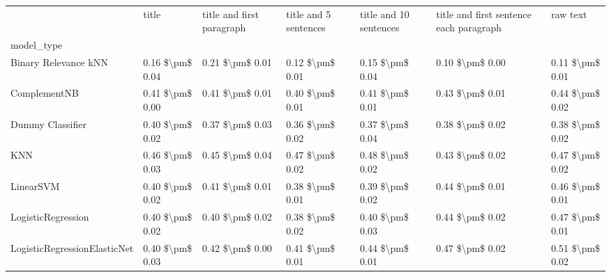 \begin{tabular}{lllllll}
\toprule
{} &            title & title and first paragraph & title and 5 sentences & title and 10 sentences & title and first sentence each paragraph &             raw text \\
model\_type                      &                  &                           &                       &                        &                                         &                      \\
\midrule
Binary Relevance kNN            &  0.16 \$\textbackslash pm\$ 0.04 &           0.21 \$\textbackslash pm\$ 0.01 &       0.12 \$\textbackslash pm\$ 0.01 &        0.15 \$\textbackslash pm\$ 0.04 &                         0.10 \$\textbackslash pm\$ 0.00 &      0.11 \$\textbackslash pm\$ 0.01 \\
ComplementNB                    &  0.41 \$\textbackslash pm\$ 0.00 &           0.41 \$\textbackslash pm\$ 0.01 &       0.40 \$\textbackslash pm\$ 0.01 &        0.41 \$\textbackslash pm\$ 0.01 &                         0.43 \$\textbackslash pm\$ 0.01 &      0.44 \$\textbackslash pm\$ 0.02 \\
Dummy Classifier                &  0.40 \$\textbackslash pm\$ 0.02 &           0.37 \$\textbackslash pm\$ 0.03 &       0.36 \$\textbackslash pm\$ 0.02 &        0.37 \$\textbackslash pm\$ 0.04 &                         0.38 \$\textbackslash pm\$ 0.02 &      0.38 \$\textbackslash pm\$ 0.02 \\
KNN                             &  0.46 \$\textbackslash pm\$ 0.03 &           0.45 \$\textbackslash pm\$ 0.04 &       0.47 \$\textbackslash pm\$ 0.02 &        0.48 \$\textbackslash pm\$ 0.02 &                         0.43 \$\textbackslash pm\$ 0.02 &      0.47 \$\textbackslash pm\$ 0.02 \\
LinearSVM                       &  0.40 \$\textbackslash pm\$ 0.02 &           0.41 \$\textbackslash pm\$ 0.01 &       0.38 \$\textbackslash pm\$ 0.01 &        0.39 \$\textbackslash pm\$ 0.02 &                         0.44 \$\textbackslash pm\$ 0.01 &      0.46 \$\textbackslash pm\$ 0.01 \\
LogisticRegression              &  0.40 \$\textbackslash pm\$ 0.02 &           0.40 \$\textbackslash pm\$ 0.02 &       0.38 \$\textbackslash pm\$ 0.02 &        0.40 \$\textbackslash pm\$ 0.03 &                         0.44 \$\textbackslash pm\$ 0.02 &      0.47 \$\textbackslash pm\$ 0.01 \\
LogisticRegressionElasticNet    &  0.40 \$\textbackslash pm\$ 0.03 &           0.42 \$\textbackslash pm\$ 0.00 &       0.41 \$\textbackslash pm\$ 0.01 &        0.44 \$\textbackslash pm\$ 0.01 &                         0.47 \$\textbackslash pm\$ 0.02 &      0.51 \$\textbackslash pm\$ 0.02 \\

\end{tabular}
